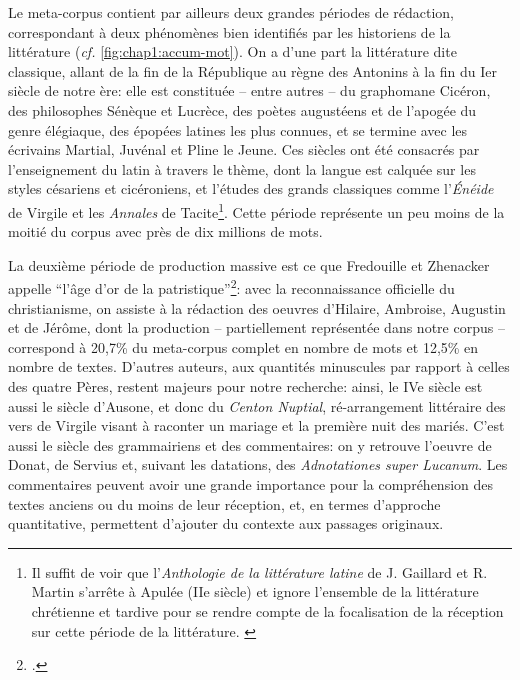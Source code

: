 Le meta-corpus contient par ailleurs deux grandes périodes de rédaction, correspondant à deux phénomènes bien identifiés par les historiens de la littérature (\textit{cf.} \ref{fig:chap1:accum-mot}). On a d'une part la littérature dite classique, allant de la fin de la République au règne des Antonins à la fin du Ier siècle de notre ère: elle est constituée -- entre autres -- du graphomane Cicéron, des philosophes Sénèque et Lucrèce, des poètes augustéens et de l'apogée du genre élégiaque, des épopées latines les plus connues, et se termine avec les écrivains Martial, Juvénal et Pline le Jeune. Ces siècles ont été consacrés par l'enseignement du latin à travers le thème, dont la langue est calquée sur les styles césariens et cicéroniens, et l'études des grands classiques comme l'\textit{Énéide} de Virgile et les \textit{Annales} de Tacite\footnote{Il suffit de voir que l'\textit{Anthologie de la littérature latine} de J. Gaillard et R. Martin s'arrête à Apulée (IIe siècle) et ignore l'ensemble de la littérature chrétienne et tardive pour se rendre compte de la focalisation de la réception sur cette période de la littérature. \textcite{gaillard_anthologie_2005}}. Cette période représente un peu moins de la moitié du corpus avec près de dix millions de mots. 

La deuxième période de production massive est ce que Fredouille et Zhenacker appelle \enquote{l'âge d'or de la patristique}\footcite{fredouille}: avec la reconnaissance officielle du christianisme, on assiste à la rédaction des oeuvres d'Hilaire, Ambroise, Augustin et de Jérôme, dont la production -- partiellement représentée dans notre corpus -- correspond à 20,7\% du meta-corpus complet en nombre de mots et 12,5\% en nombre de textes. D'autres auteurs, aux quantités minuscules par rapport à celles des quatre Pères, restent majeurs pour notre recherche: ainsi, le IVe siècle est aussi le siècle d'Ausone, et donc du \textit{Centon Nuptial}, ré-arrangement littéraire des vers de Virgile visant à raconter un mariage et la première nuit des mariés. C'est aussi le siècle des grammairiens et des commentaires: on y retrouve l'oeuvre de Donat, de Servius et, suivant les datations, des \textit{Adnotationes super Lucanum}. Les commentaires peuvent avoir une grande importance pour la compréhension des textes anciens ou du moins de leur réception, et, en termes d'approche quantitative, permettent d'ajouter du contexte aux passages originaux.

